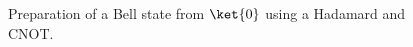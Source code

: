 \begin{figure}
    \centering
    \begin{tikzpicture}
        
    \end{tikzpicture}

    \caption{Preparation of a Bell state from $\ket{0}$ using a Hadamard and CNOT.}
    \label{randomunitarycircuit}
\end{figure}